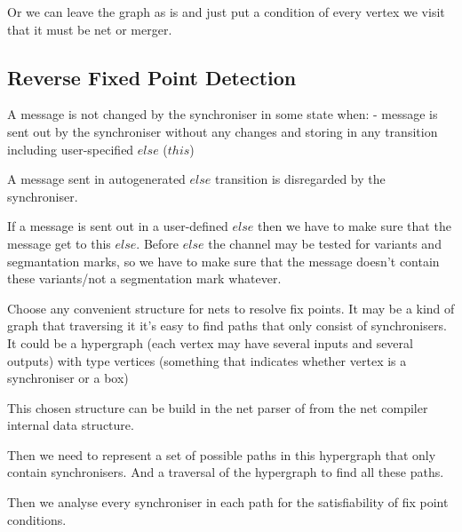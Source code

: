 Or we can leave the graph as is and just put a condition of every vertex we visit that it must be net or merger.


    \subsection{Reverse Fixed Point Detection\label{rfp_detect}}
A message is not changed by the synchroniser in some state when:
- message is sent out by the synchroniser without any changes and storing in any transition including user-specified $else$ ($this$)

A message sent in autogenerated $else$ transition is disregarded by the synchroniser.

If a message is sent out in a user-defined $else$ then we have to make sure that the message get to this $else$. Before $else$ the channel may be tested for variants and segmantation marks, so we have to make sure that the message doesn't contain these variants/not a segmentation mark whatever.


Choose any convenient structure for nets to resolve fix points. It may be a kind of graph that traversing it it's easy to find paths that only consist of synchronisers.
It could be a hypergraph (each vertex may have several inputs and several outputs) with type vertices (something that indicates whether vertex is a synchroniser or a box)

This chosen structure can be build in the net parser of from the net compiler internal data structure.

Then we need to represent a set of possible paths in this hypergraph that only contain synchronisers. And a traversal of the hypergraph to find all these paths.

Then we analyse every synchroniser in each path for the satisfiability of fix point conditions.

